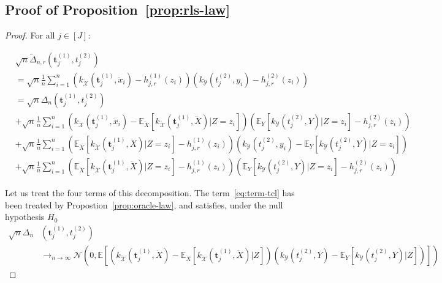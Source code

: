 \subsection{Proof of Proposition~\lowercase{\ref{prop:rls-law}}}
\label{prv:rls-law}

\begin{proof} For all $j\in[J]$:
    
\begin{align}
  &\sqrt{n}\widetilde{\Delta}_{n,r}(\mathbf{t}^{(1)}_j,t^{(2)}_j)\\
  &= \sqrt{n}\frac{1}{n}\sum_{i=1}^n  \left(k_{\mathcal{\ddot{X}}}(\mathbf{t}^{(1)}_j,\ddot{x}_i)- h^{(1)}_{j,r}(z_i)\right)\left(k_{\mathcal{Y}}(t^{(2)}_j,y_i)- h^{(2)}_{j,r}(z_i)\right)\nonumber\\
  &= \sqrt{n}\Delta_{n}(\mathbf{t}^{(1)}_j,t^{(2)}_j)\label{eq:term-tcl}\\
  &+\sqrt{n} \frac1n\sum_{i=1}^n\left(k_{\mathcal{\ddot{X}}}(\mathbf{t}^{(1)}_j,\ddot{x}_i)-\mathbb{E}_{\ddot{X}}\left[k_{\mathcal{\ddot{X}}}(\mathbf{t}^{(1)}_j,\ddot{X})|Z=z_i\right]\right)\left(\mathbb{E}_{Y}\left[k_{\mathcal{Y}}(t^{(2)}_j,Y)|Z=z_i\right]- h^{(2)}_{j,r}(z_i)\right)\label{eq:term-cross1}\\
  &+\sqrt{n}\frac1n\sum_{i=1}^n\left(\mathbb{E}_{\ddot{X}}\left[k_{\mathcal{\ddot{X}}}(\mathbf{t}^{(1)}_j,\ddot{X})|Z=z_i\right]-h^{(1)}_{j,r}(z_i)\right)\left(k_{\mathcal{Y}}(t^{(2)}_j,y_i)-\mathbb{E}_{Y}\left[k_{\mathcal{Y}}(t^{(2)}_j,Y)|Z=z_i\right]\right)\label{eq:term-cross2}\\
  &+\sqrt{n}\frac1n\sum_{i=1}^n\left(\mathbb{E}_{\ddot{X}}\left[k_{\mathcal{\ddot{X}}}(\mathbf{t}^{(1)}_j,\ddot{X})|Z=z_i\right]-h^{(1)}_{j,r}(z_i)\right)\left(\mathbb{E}_{Y}\left[k_{\mathcal{Y}}(t^{(2)}_j,Y)|Z=z_i\right]-h^{(2)}_{j,r}(z_i)\right)\label{eq:term-cross3}
\end{align} 

Let us treat the four terms of this decomposition. The term~\eqref{eq:term-tcl} has been treated by Propostion~\ref{prop:oracle-law}, and satisfies, under the null hypothesis $H_0$
\begin{align*}
\sqrt{n}\Delta_{n}&(\mathbf{t}_j^{(1)},t_j^{(2)})\\
&\to_{n\to\infty} \mathcal{N}\left(0,\mathbb{E}\left[\left(k_{\mathcal{\ddot{X}}}(\mathbf{t}^{(1)}_j,\ddot{X})-\mathbb{E}_{\ddot{X}}\left[k_{\mathcal{\ddot{X}}}(\mathbf{t}^{(1)}_j,\ddot{X})|Z\right]\right)\left(k_{\mathcal{Y}}(t^{(2)}_j,Y)-\mathbb{E}_{Y}\left[k_{\mathcal{Y}}(t^{(2)}_j,Y)|Z\right]\right)\right]\right)
\end{align*}


\end{proof}
